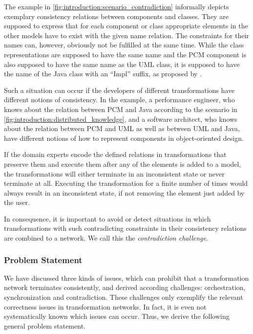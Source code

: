 The example in \autoref{fig:introduction:scenario_contradiction} informally depicts exemplary consistency relations between components and classes.
They are supposed to express that for each component or class appropriate elements in the other models have to exist with the given name relation.
The constraints for their names can, however, obviously not be fulfilled at the same time.
While the class representations are supposed to have the same name and the \gls{PCM} component is also supposed to have the same name as the \gls{UML} class, it is supposed to have the name of the Java class with an \enquote{Impl} suffix, as proposed by \textcite{langhammer2017a}.

Such a situation can occur if the developers of different transformations have different notions of consistency.
In the example, a performance engineer, who knows about the relation between \gls{PCM} and Java according to the scenario in \autoref{fig:introduction:distributed_knowledge}, and a software architect, who knows about the relation between \gls{PCM} and \gls{UML} as well as between \gls{UML} and Java, have different notions of how to represent components in object-oriented design.

If the domain experts encode the defined relations in transformations that preserve them and execute them after any of the elements is added to a model, the transformations will either terminate in an inconsistent state or never terminate at all.
Executing the transformation for a finite number of times would always result in an inconsistent state, if not removing the element just added by the user.

In consequence, it is important to avoid or detect situations in which transformations with such contradicting constraints in their consistency relations are combined to a network.
We call this the \emph{contradiction challenge}.

\subsubsection*{Problem Statement}

We have discussed three kinds of issues, which can prohibit that a transformation network terminates consistently, and derived according challenges: orchestration, synchronization and contradiction.
These challenges only exemplify the relevant correctness issues in transformation networks. 
In fact, it is even not systematically known which issues can occur.
Thus, we derive the following general problem statement.

